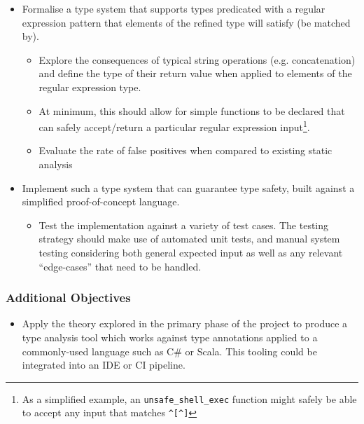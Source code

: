 \documentclass[a4paper,openany,12pt]{book}
\begin{document}
\begin{itemize}
    \item Formalise a type system that supports types predicated with a regular expression pattern that elements of the refined type will satisfy (be matched by).
    
    \begin{itemize}
        \item Explore the consequences of typical string operations (e.g. concatenation) and define the type of their return value when applied to elements of the regular expression type.
        
        \item At minimum, this should allow for simple functions to be declared that can safely accept/return a particular regular expression input\footnote{As a simplified example, an \texttt{unsafe\_shell\_exec} function might safely be able to accept any input that matches \texttt{\textasciicircum{}[\textasciicircum{}\textasciigrave{}]\textdollar{}}}.
        
        \item Evaluate the rate of false positives when compared to existing static analysis 
    \end{itemize}
    
    \item Implement such a type system that can guarantee type safety, built against a simplified proof-of-concept language.
    \begin{itemize}
        \item Test the implementation against a variety of test cases. The testing strategy should make use of automated unit tests, and manual system testing considering both general expected input as well as any relevant ``edge-cases'' that need to be handled.
    \end{itemize}
\end{itemize}

\subsubsection*{Additional Objectives}

\begin{itemize}
    \item Apply the theory explored in the primary phase of the project to produce a type analysis tool which works against type annotations applied to a commonly-used language such as C\# or Scala. This tooling could be integrated into an IDE or CI pipeline.
\end{itemize}
\end{document}
